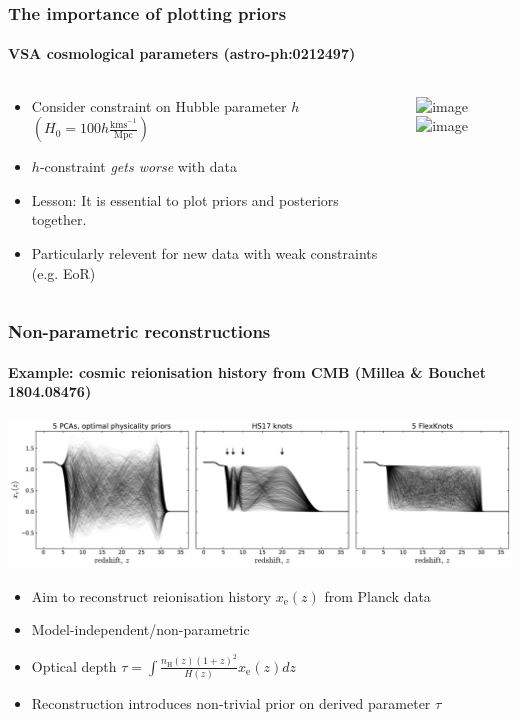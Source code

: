 \documentclass[%
]{beamer}
\begin{document}
\begin{frame}
    \frametitle{The importance of plotting priors}
    \framesubtitle{VSA cosmological parameters (astro-ph:0212497)}

    \begin{columns}
        \begin{column}{0.5\textwidth}
        \begin{itemize}
            \item<1-> Consider constraint on Hubble parameter $h$ $(H_0 = 100h\frac{\mathrm{kms}^{-1}}{\mathrm{Mpc}})$
            \item<3-> $h$-constraint {\em gets worse\/} with data
            \item<3-> Lesson: It is essential to plot priors and posteriors together.
            \item<3-> Particularly relevent for new data with weak constraints (e.g. EoR)
        \end{itemize}
        \end{column}
        \begin{column}{0.5\textwidth}
            \includegraphics<1>[width=\textwidth]{figures/vsa_prior}
            \includegraphics<2->[width=\textwidth]{figures/vsa_posterior}
        \end{column}
    \end{columns}
\end{frame}

\begin{frame}
    \frametitle{Non-parametric reconstructions}
    \framesubtitle{Example: cosmic reionisation history from CMB (Millea \& Bouchet 1804.08476)}
    \includegraphics[width=\textwidth]{figures/reio_hists_prior}
    \begin{itemize}
        \item Aim to reconstruct reionisation history $x_\mathrm{e}(z)$ from Planck data 
        \item Model-independent/non-parametric
        \item Optical depth $\tau = \int \frac{n_\mathrm{H}(z){(1+z)}^2}{H(z)}x_\mathrm{e}(z) dz $
        \item Reconstruction introduces non-trivial prior on derived parameter $\tau$
    \end{itemize}
\end{frame}
\end{document}
